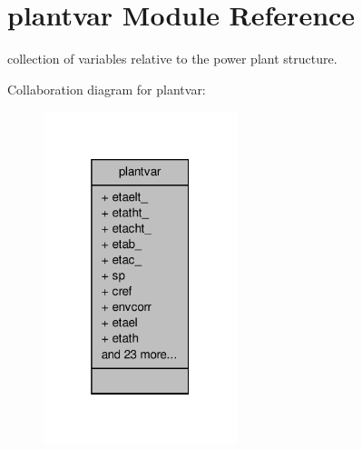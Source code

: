\hypertarget{classplantvar}{\section{plantvar Module Reference}
\label{classplantvar}
}


collection of variables relative to the power plant structure.  




Collaboration diagram for plantvar\-:\nopagebreak
\begin{figure}[H]
\begin{center}
\leavevmode
\includegraphics[width=160pt]{classplantvar__coll__graph}
\end{center}
\end{figure}
